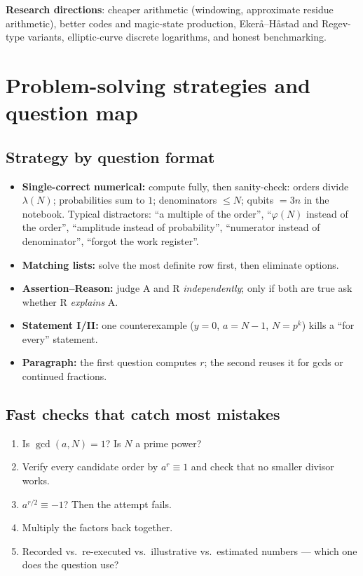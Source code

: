 \documentclass[11pt,a4paper,openany]{book}
\begin{document}
\textbf{Research directions}: cheaper arithmetic (windowing, approximate residue arithmetic), better codes and magic-state production, Ekerå--Håstad and
Regev-type variants, elliptic-curve discrete logarithms, and honest benchmarking.

\section{Problem-solving strategies and question map}
\subsection{Strategy by question format}
\begin{itemize}[itemsep=3pt]
\item \textbf{Single-correct numerical:} compute fully, then sanity-check: orders divide $\lambda(N)$; probabilities sum to $1$; denominators $\le N$; qubits $= 3n$ in the
      notebook. Typical distractors: ``a multiple of the order'', ``$\varphi(N)$ instead of the order'', ``amplitude instead of probability'', ``numerator instead of
      denominator'', ``forgot the work register''.
\item \textbf{Matching lists:} solve the most definite row first, then eliminate options.
\item \textbf{Assertion--Reason:} judge A and R \emph{independently}; only if both are true ask whether R \emph{explains} A.
\item \textbf{Statement I/II:} one counterexample ($y = 0$, $a = N - 1$, $N = p^k$) kills a ``for every'' statement.
\item \textbf{Paragraph:} the first question computes $r$; the second reuses it for gcds or continued fractions.
\end{itemize}
\subsection{Fast checks that catch most mistakes}
\begin{enumerate}[itemsep=2pt]
\item Is $\gcd(a, N) = 1$? Is $N$ a prime power?
\item Verify every candidate order by $a^r \equiv 1$ and check that no smaller divisor works.
\item $a^{r/2} \equiv -1$? Then the attempt fails.
\item Multiply the factors back together.
\item Recorded vs.\ re-executed vs.\ illustrative vs.\ estimated numbers --- which one does the question use?
\end{enumerate}
\end{document}
